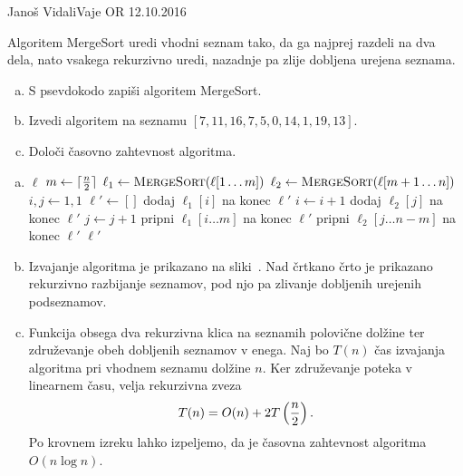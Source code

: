 \begin{naloga}{Janoš Vidali}{Vaje OR 12.10.2016}
\begin{vprasanje}
Algoritem {\sc MergeSort} uredi vhodni seznam tako,
da ga najprej razdeli na dva dela,
nato vsakega rekurzivno uredi,
nazadnje pa zlije dobljena urejena seznama.
\begin{enumerate}[(a)]
\item S psevdokodo zapiši algoritem {\sc MergeSort}.
\item Izvedi algoritem na seznamu $[7, 11, 16, 7, 5, 0, 14, 1, 19, 13]$.
\item Določi časovno zahtevnost algoritma.
\end{enumerate}
\end{vprasanje}

\begin{odgovor}
\begin{enumerate}[(a)]
\item
\begin{small}
\begin{algorithmic}
        \State \Return $\ell$
    \EndIf
    \State $m \gets \lceil {n \over 2} \rceil$
    \State $\ell_1 \gets \text{\sc MergeSort}(\ell[1 \dots m])$
    \State $\ell_2 \gets \text{\sc MergeSort}(\ell[m+1 \dots n])$
    \State $i, j \gets 1, 1$
    \State $\ell' \gets []$
            \State dodaj $\ell_1[i]$ na konec $\ell'$
            \State $i \gets i+1$
        \Else
            \State dodaj $\ell_2[j]$ na konec $\ell'$
            \State $j \gets j+1$
        \EndIf
    \EndWhile
    \State pripni $\ell_1[i \dots m]$ na konec $\ell'$
    \State pripni $\ell_2[j \dots n-m]$ na konec $\ell'$
    \State \Return $\ell'$
\EndFunction
\end{algorithmic}
\end{small}

\item Izvajanje algoritma je prikazano na sliki~\fig{}.
Nad črtkano črto je prikazano rekurzivno razbijanje seznamov,
pod njo pa zlivanje dobljenih urejenih podseznamov.

\item Funkcija obsega dva rekurzivna klica na seznamih polovične dolžine
ter združevanje obeh dobljenih seznamov v enega.
Naj bo $T(n)$ čas izvajanja algoritma pri vhodnem seznamu dolžine $n$.
Ker združevanje poteka v linearnem času, velja rekurzivna zveza
$$
T(n) = O(n) + 2T\left({n \over 2}\right) .
$$
Po krovnem izreku lahko izpeljemo,
da je časovna zahtevnost algoritma $O(n \log n)$.
\end{enumerate}

\begin{slika}
\pgfslika
{}
\end{slika}
\end{odgovor}
\end{naloga}
